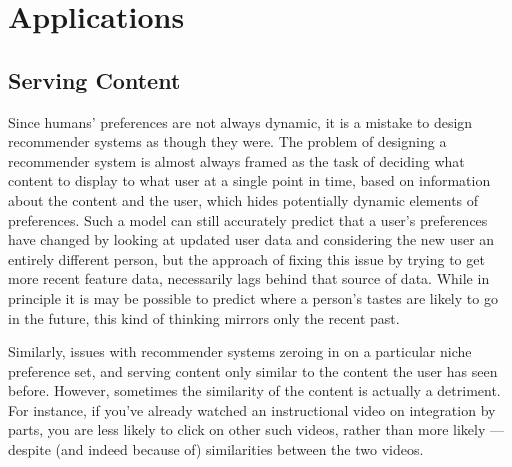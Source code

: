 \documentclass{article}
\theoremstyle{plain}
\theoremstyle{definition}
\theoremstyle{remark}
\begin{document}
%	
%		
		\section{Applications}
	
	
	\subsection{Serving Content}
	Since humans' preferences are not always dynamic, it is a mistake to design recommender systems as though they were. The problem of designing a recommender system is almost always framed as the task of deciding what content to display to what user at a single point in time, based on information about the content and the user, which hides potentially dynamic elements of preferences. Such a model can still accurately predict that a user's preferences have changed by looking at updated user data and considering the new user an entirely different person, but the approach of fixing this issue by trying to get more recent feature data, necessarily lags behind that source of data. While in principle it is may be possible to predict where a person's tastes are likely to go in the future, this kind of thinking mirrors only the recent past.
	
	Similarly, issues with recommender systems zeroing in on a particular niche preference set, and serving content only similar to the content the user has seen before. However, sometimes the similarity of the content is actually a detriment. For instance, if you've already watched an instructional video on integration by parts, you are less likely to click on other such videos, rather than more likely --- despite (and indeed because of) similarities between the two videos.
	
\end{document}
